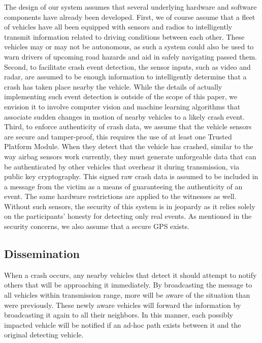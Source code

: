 \documentclass{IEEEtran}
\begin{document}
The design of our system assumes that several underlying hardware and software components have already been developed.
First, we of course assume that a fleet of vehicles have all been equipped with sensors and radios to intelligently transmit information related to driving conditions between each other.
These vehicles may or may not be autonomous, as such a system could also be used to warn drivers of upcoming road hazards and aid in safely navigating passed them.
Second, to facilitate crash event detection, the sensor inputs, such as video and radar, are assumed to be enough information to intelligently determine that a crash has taken place nearby the vehicle.
While the details of actually implementing such event detection is outside of the scope of this paper, we envision it to involve computer vision and machine learning algorithms that associate sudden changes in motion of nearby vehicles to a likely crash event.
Third, to enforce authenticity of crash data, we assume that the vehicle sensors are secure and tamper-proof, this requires the use of at least one Trusted Platform Module.
When they detect that the vehicle has crashed, similar to the way airbag sensors work currently, they must generate unforgeable data that can be authenticated by other vehicles that overhear it during transmission, via public key cryptography.
This signed raw crash data is assumed to be included in a message from the victim as a means of guaranteeing the authenticity of an event. The same hardware restrictions are applied to the witnesses as well.
Without such sensors, the security of this system is in jeopardy as it relies solely on the participants' honesty for detecting only real events. As mentioned in the security concerns, we also assume that a secure GPS exists. 

\subsection{Dissemination}

When a crash occurs, any nearby vehicles that detect it should attempt to notify others that will be approaching it immediately.
By broadcasting the message to all vehicles within transmission range, more will be aware of the situation than were previously.
These newly aware vehicles will forward the information by broadcasting it again to all their neighbors.
In this manner, each possibly impacted vehicle will be notified if an ad-hoc path exists between it and the original detecting vehicle.
\end{document}
